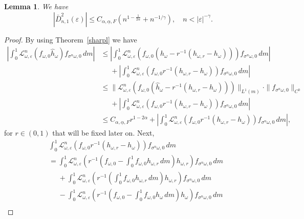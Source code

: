 \documentclass[12pt,reqno,a4paper]{article}
\newtheorem{lemma}[theorem]{Lemma}
\begin{document}
\begin{lemma}\label{lem:aux2}
	We have
	\[
	|\bar D_{n, 1}^2(\varepsilon)| \le C_{\alpha, \underline{\alpha}, F}( 
	n^{1-\frac{1}{2\alpha}}
	+n^{-1/\gamma}), \quad n<|\varepsilon|^{-\gamma}.
	\]
\end{lemma}
\begin{proof}
	By using Theorem~\ref{sharpl} we have
	\begin{equation}\label{gh1}
		\begin{split}
			\left |\int_0^1 \mathcal L_{\omega, \varepsilon}^n (f_{\omega, 0}\hat h_\omega)f_{\sigma^n \omega, 0}\, dm\right | &\le \left |\int_0^1 \mathcal L_{\omega, \varepsilon}^n (f_{\omega, 0}(\hat h_\omega-r^{-1}(h_{\omega, r}-h_\omega)))
			f_{\sigma^n \omega, 0}\, dm\right | \\
			&\phantom{\le}+\left |\int_0^1 \mathcal L_{\omega, \varepsilon}^n (f_{\omega, 0}r^{-1}(h_{\omega, r}-h_\omega))f_{\sigma^n \omega, 0}\, dm\right | \\
			&\le \|\mathcal L_{\omega, \varepsilon}^n (f_{\omega, 0}(\hat h_\omega-r^{-1}(h_{\omega, r}-h_\omega)))\|_{L^1(m)} \cdot \|f_{\sigma^n \omega, 0}\|_{C^0}\\
			&\phantom{\le}+\left |\int_0^1 \mathcal L_{\omega, \varepsilon}^n (f_{\omega, 0}r^{-1}(h_{\omega, r}-h_\omega))f_{\sigma^n \omega, 0}\, dm\right |\\
			&\le C_{\alpha, \underline{\alpha}, F}r^{1-2\alpha}+ \left |\int_0^1 \mathcal L_{\omega, \varepsilon}^n (f_{\omega, 0}r^{-1}(h_{\omega, r}-h_\omega))f_{\sigma^n \omega, 0}\, dm\right |,
		\end{split}
	\end{equation}
	for $r\in (0, 1)$ that will be fixed later on.
	Next,
	\[
	\begin{split}
		& \int_0^1 \mathcal L_{\omega, \varepsilon}^n (f_{\omega, 0}r^{-1}(h_{\omega, r}-h_\omega))f_{\sigma^n \omega, 0}\, dm \\
		&=\int_0^1 \mathcal L_{\omega, \varepsilon}^n \left (r^{-1}\left (f_{\omega, 0}-\int_0^1f_{\omega, 0}h_{\omega, r}\, dm\right )h_{\omega, r}\right )f_{\sigma^n \omega, 0}\, dm \\
		&\phantom{=}+\int_0^1 \mathcal L_{\omega, \varepsilon}^n \left (r^{-1}\left (\int_0^1 f_{\omega, 0}h_{\omega, r}\, dm\right )h_{\omega, r}\right )f_{\sigma^n \omega, 0}\, dm \\
		&\phantom{=}-\int_0^1 \mathcal L_{\omega, \varepsilon}^n \left(r^{-1} \left (f_{\omega, 0}-\int_0^1 f_{\omega, 0}h_\omega\, dm\right )h_\omega \right )f_{\sigma^n \omega, 0}\, dm \\

\end{split}\]
\end{proof}
\end{document}
